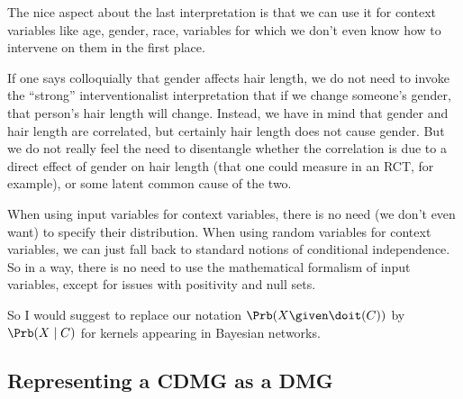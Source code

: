 The nice aspect about the last interpretation is that we can use it for context variables like age, gender, race, variables for which we don't even know how to intervene on them in the first place.

If one says colloquially that gender affects hair length, we do not need to invoke the ``strong'' interventionalist interpretation that if we change someone's gender, that person's hair length will change.
Instead, we have in mind that gender and hair length are correlated, but certainly hair length does not cause gender.
But we do not really feel the need to disentangle whether the correlation is due to a direct effect of gender on hair length (that one could measure in an RCT, for example), or some latent common cause of the two.

When using input variables for context variables, there is no need (we don't even want) to specify their distribution.
When using random variables for context variables, we can just fall back to standard notions of conditional independence.
So in a way, there is no need to use the mathematical formalism of input variables, except for issues with positivity and null sets.

So I would suggest to replace our notation $\Prb(X \given \doit(C))$ by $\Prb(X \mid C)$ for kernels appearing in Bayesian networks.


\subsection{Representing a CDMG as a DMG}

